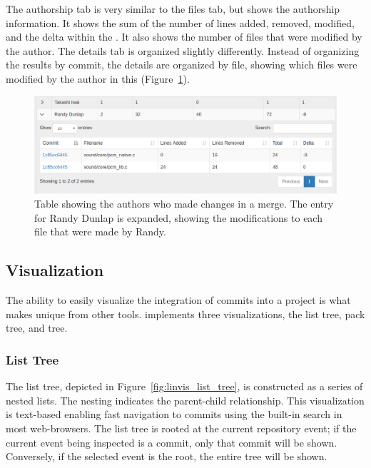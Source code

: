 The authorship tab is very similar to the files tab, but shows the
authorship information. It shows the sum of the number of lines added,
removed, modified, and the delta within the \mt. It also shows the
number of files that were modified by the author. The details tab is
organized slightly differently. Instead of organizing the results by
commit, the details are organized by file, showing which files were
modified by the author in this \mt (Figure~\ref{fig:linvis_authors}).

\begin{figure}[htpb]
  \centering
  \includegraphics[width=\figwidth]{figures/linvis/linvis_authors.png}
  \caption{Table showing the authors who made changes in a merge. The
    entry for Randy Dunlap is expanded, showing the modifications to
    each file that were made by Randy.}
  \label{fig:linvis_authors}
\end{figure}


\subsection{Visualization}
\label{sub:visualization}

The ability to easily visualize the integration of commits into a
project is what makes \tool unique from other tools. \tool implements
three visualizations, the list tree, pack tree, and \rt tree.

\subsubsection{List Tree}

The list tree, depicted in Figure~\ref{fig:linvis_list_tree}, is
constructed as a series of nested lists. The nesting indicates the
parent-child relationship. This visualization is text-based enabling
fast navigation to commits using the built-in search in most
web-browsers. The list tree is rooted at the current repository event;
if the current event being inspected is a commit, only that commit will
be shown. Conversely, if the selected event is the root, the entire
\mt tree will be shown.


